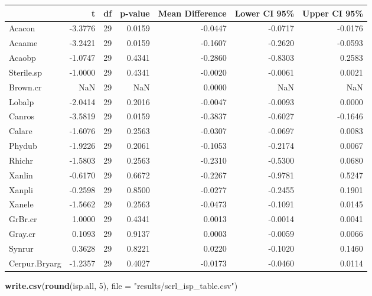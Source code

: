 \documentclass[]{article}
\newenvironment{Shaded}{\begin{snugshade}}{\end{snugshade}}
\newcommand{\KeywordTok}[1]{\textcolor[rgb]{0.13,0.29,0.53}{\textbf{#1}}}
\newcommand{\DataTypeTok}[1]{\textcolor[rgb]{0.13,0.29,0.53}{#1}}
\newcommand{\DecValTok}[1]{\textcolor[rgb]{0.00,0.00,0.81}{#1}}
\newcommand{\StringTok}[1]{\textcolor[rgb]{0.31,0.60,0.02}{#1}}
\newcommand{\NormalTok}[1]{#1}
\begin{document}
\begin{Shaded}
\end{Shaded}

\begin{longtable}[]{@{}lrrrrrr@{}}
\toprule
& t & df & p-value & Mean Difference & Lower CI 95\% & Upper CI
95\%\tabularnewline
\midrule
\endhead
Acacon & -3.3776 & 29 & 0.0159 & -0.0447 & -0.0717 &
-0.0176\tabularnewline
Acaame & -3.2421 & 29 & 0.0159 & -0.1607 & -0.2620 &
-0.0593\tabularnewline
Acaobp & -1.0747 & 29 & 0.4341 & -0.2860 & -0.8303 &
0.2583\tabularnewline
Sterile.sp & -1.0000 & 29 & 0.4341 & -0.0020 & -0.0061 &
0.0021\tabularnewline
Brown.cr & NaN & 29 & NaN & 0.0000 & NaN & NaN\tabularnewline
Lobalp & -2.0414 & 29 & 0.2016 & -0.0047 & -0.0093 &
0.0000\tabularnewline
Canros & -3.5819 & 29 & 0.0159 & -0.3837 & -0.6027 &
-0.1646\tabularnewline
Calare & -1.6076 & 29 & 0.2563 & -0.0307 & -0.0697 &
0.0083\tabularnewline
Phydub & -1.9226 & 29 & 0.2061 & -0.1053 & -0.2174 &
0.0067\tabularnewline
Rhichr & -1.5803 & 29 & 0.2563 & -0.2310 & -0.5300 &
0.0680\tabularnewline
Xanlin & -0.6170 & 29 & 0.6672 & -0.2267 & -0.9781 &
0.5247\tabularnewline
Xanpli & -0.2598 & 29 & 0.8500 & -0.0277 & -0.2455 &
0.1901\tabularnewline
Xanele & -1.5662 & 29 & 0.2563 & -0.0473 & -0.1091 &
0.0145\tabularnewline
GrBr.cr & 1.0000 & 29 & 0.4341 & 0.0013 & -0.0014 &
0.0041\tabularnewline
Gray.cr & 0.1093 & 29 & 0.9137 & 0.0003 & -0.0059 &
0.0066\tabularnewline
Synrur & 0.3628 & 29 & 0.8221 & 0.0220 & -0.1020 & 0.1460\tabularnewline
Cerpur.Bryarg & -1.2357 & 29 & 0.4027 & -0.0173 & -0.0460 &
0.0114\tabularnewline
\bottomrule
\end{longtable}

\begin{Shaded}
\begin{Highlighting}[]
\KeywordTok{write.csv}\NormalTok{(}\KeywordTok{round}\NormalTok{(isp.all, }\DecValTok{5}\NormalTok{), }\DataTypeTok{file =} \StringTok{"results/scrl_isp_table.csv"}\NormalTok{)}
\end{Highlighting}
\end{Shaded}
\end{document}
